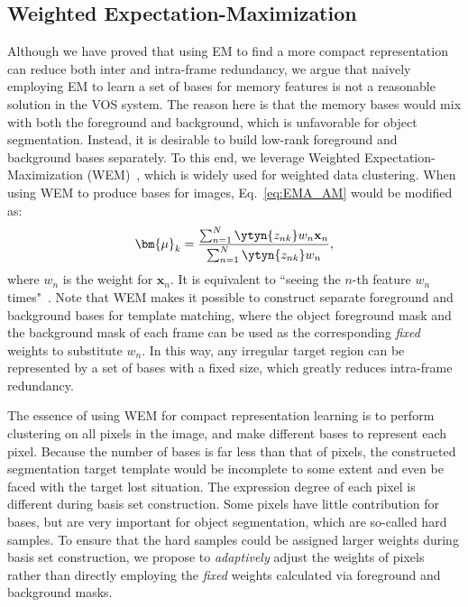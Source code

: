 \subsection{Weighted Expectation-Maximization}
\label{subsec:WEM}
Although we have proved that using EM to find a more compact representation can reduce both inter and intra-frame redundancy, we argue that naively employing EM to learn a set of bases for memory features is not a reasonable solution in the VOS system. The reason here is that the memory bases would mix with both the foreground and background, which is unfavorable for object segmentation.
Instead, it is desirable to build low-rank foreground and background bases separately. To this end, we leverage Weighted Expectation-Maximization (WEM)~\cite{long2006spectral,tseng2007penalized,ackerman2012weighted,feldman2012data,gebru2016algorithms}, which is widely used for weighted data clustering. When using WEM to produce bases for images, Eq.~\eqref{eq:EMA_AM} would be modified as:
\begin{equation}
 \bm{\mu}_{k} = \frac{\sum^{N}_{n=1}\ytyn{z_{nk}}w_n\mathbf{x}_{n}} {\sum^{N}_{n=1}\ytyn{z_{nk}}w_n},
 \label{eq:WEM_M}
\end{equation}
where $w_n$ is the weight for $\mathbf{x}_{n}$. It is equivalent to ``seeing the $n$-th feature $w_n$ times"~\cite{gebru2016algorithms}.
Note that WEM makes it possible to construct separate foreground and background bases for template matching, where
the object foreground mask and the background mask of each frame can be used as the corresponding \textit{fixed} weights to substitute $w_n$. 
In this way, any irregular target region can be represented by a set of bases with a fixed size, which greatly reduces intra-frame redundancy.

The essence of using WEM for compact representation learning is to perform clustering on all pixels in the image, and make different bases to represent each pixel. Because the number of bases is far less than that of pixels, the constructed segmentation target template would be incomplete to some extent and even be faced with the target lost situation. The expression degree of each pixel is different during basis set construction. Some pixels have little contribution for bases, but are very important for object segmentation, which are so-called hard samples.
To ensure that the hard samples could be assigned larger weights during basis set construction, we propose to \textit{adaptively} adjust the weights of pixels rather than directly employing the \textit{fixed} weights calculated via foreground and background masks.

